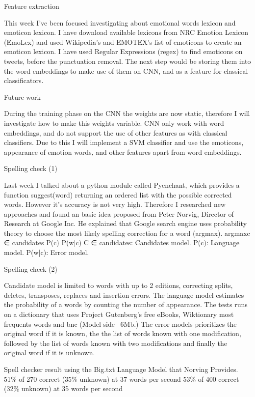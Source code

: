 Feature extraction

This week I’ve been focused investigating about emotional words lexicon and emoticon lexicon. I have download available lexicons from NRC Emotion Lexicon (EmoLex) and used Wikipedia’s and EMOTEX’s list of emoticons to create an emoticon lexicon. I have used Regular Expressions (regex) to find emoticons on tweets, before the punctuation removal.
The next step would be storing them into the word embeddings to make use of them on CNN, and as a feature for classical classificators.

Future work

During the training phase on the CNN the weights are now static, therefore I will investigate how to make this weights variable.
CNN only work with word embeddings, and do not support the use of other features as with classical classifiers. Due to this I will implement a SVM classifier and use the emoticons, appearance of emotion words, and other features apart from word embeddings.

Spelling check (1)

Last week I talked about a python module called Pyenchant, which provides a function suggest(word) returning an ordered list with the possible corrected words. However it’s accuracy is not very high. Therefore I researched new approaches and found an basic idea proposed from Peter Norvig\cite{PeterNorvigSpell}, Director of Research at Google Inc. He explained that Google search engine uses probability theory to choose the most likely spelling correction for a word (argmax).
argmaxc ∈ candidates P(c) P(w|c)
C ∈ candidates: Candidates model.
P(c): Language model.
P(w|c): Error model.

Spelling check (2)

Candidate model is limited to words with up to 2 editions, correcting splits, deletes, transposes, replaces and insertion errors.
The language model estimates the probability of a words by counting the number of appearance. The tests runs on a dictionary that uses Project Gutenberg’s free eBooks, Wiktionary most frequents words\cite{WiktionaryFL} and \acrfull{bnc} \cite{bncFLAdamK} (Model side ~6Mb.)
The error models prioritizes the original word if it is known, the the list of words known with one modification, followed by the list of words known with two modifications and finally the original word if it is unknown.

Spell checker result using the Big.txt Language Model that Norving Provides.
51\% of 270 correct (35\% unknown) at 37 words per second
53\% of 400 correct (32\% unknown) at 35 words per second

